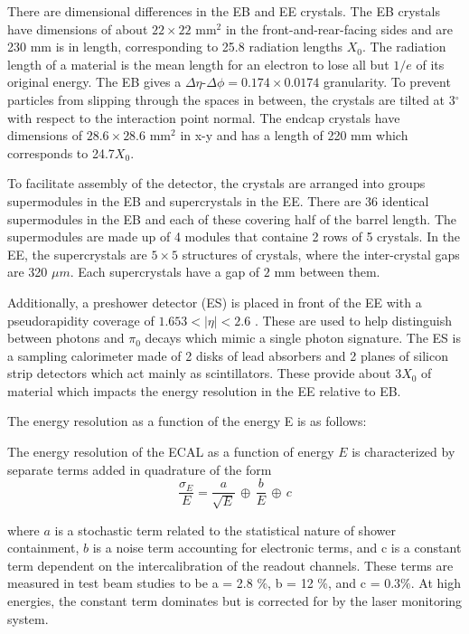 There are dimensional differences in the EB and EE crystals. The EB crystals have dimensions of about $22\times22$ mm$^2$ in the front-and-rear-facing sides and are 230 mm is in length, corresponding to 25.8 radiation lengths $X_{0}$. The radiation length of a material is the mean length for an electron to lose all but $1/e$ of its original energy. The EB gives a $\Delta \eta$-$\Delta \phi = 0.174\times0.0174$ granularity. To prevent particles from slipping through the spaces in between, the crystals are tilted at 3$^{\circ}$ with respect to the interaction point normal. The endcap crystals have dimensions of $28.6\times28.6$ mm$^2$ in x-y and has a length of 220 mm which corresponds to 24.7$X_0$. 

To facilitate assembly of the detector, the crystals are arranged into groups supermodules in the EB and supercrystals in the EE. There are 36 identical supermodules in the EB and each of these covering half of the barrel length. The supermodules are made up of 4 modules that containe 2 rows of 5 crystals. In the EE, the supercrystals are $5\times5$ structures of crystals, where the inter-crystal gaps are 320 $\mu m$. Each supercrystals have a gap of $2$ mm between them.

Additionally, a preshower detector (ES) is placed in front of the EE with a pseudorapidity coverage of $1.653 < |\eta| < 2.6$ . These are used to help distinguish between photons and $\pi_{0}$ decays which mimic a single photon signature. The ES is a sampling calorimeter made of 2 disks of lead absorbers and 2 planes of silicon strip detectors which act mainly as scintillators. These provide about 3$X_{0}$ of material which impacts the energy resolution in the EE relative to EB. 

The energy resolution as a function of the energy E is as follows:

The energy resolution of the ECAL as a function of energy $E$ is characterized by separate terms added in quadrature of the form
\begin{equation}\label{eq:energyresolution}
	\frac{\sigma_E}{E} = \frac{a}{\sqrt{E}}\,\oplus\,\frac{b}{E}\,\oplus\,c
\end{equation}

where $a$ is a stochastic term related to the statistical nature of shower containment, $b$ is a noise term accounting for electronic terms, and c is a constant term dependent on the intercalibration of the readout channels. These terms are measured in test beam studies to be a = 2.8 $\%$, b = 12 $\%$, and c = 0.3$\%$. At high energies, the constant term dominates but is corrected for by the laser monitoring system. 

